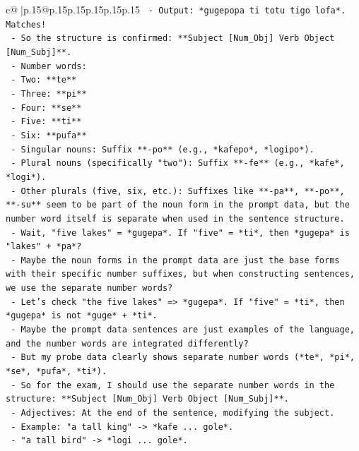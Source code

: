 \documentclass{article}
\begin{document}
{\begin{supertabular}{c@{$\;$}|p{.15\linewidth}@{}p{.15\linewidth}p{.15\linewidth}p{.15\linewidth}p{.15\linewidth}p{.15\linewidth}}
{{{\texttt{          {-} Output: *gugepopa ti totu tigo lofa*. Matches!} \\
\texttt{        {-} So the structure is confirmed: **Subject {[}Num\_Obj{]} Verb Object {[}Num\_Subj{]}**.} \\
\texttt{        {-} Number words:} \\
\texttt{          {-} Two: **te**} \\
\texttt{          {-} Three: **pi**} \\
\texttt{          {-} Four: **se**} \\
\texttt{          {-} Five: **ti**} \\
\texttt{          {-} Six: **pufa**} \\
\texttt{        {-} Singular nouns: Suffix **{-}po** (e.g., *kafepo*, *logipo*).} \\
\texttt{        {-} Plural nouns (specifically "two"): Suffix **{-}fe** (e.g., *kafe*, *logi*).} \\
\texttt{        {-} Other plurals (five, six, etc.): Suffixes like **{-}pa**, **{-}po**, **{-}su** seem to be part of the noun form in the prompt data, but the number word itself is separate when used in the sentence structure.} \\
\texttt{        {-} Wait, "five lakes" = *gugepa*. If "five" = *ti*, then *gugepa* is "lakes" + *pa*?} \\
\texttt{        {-} Maybe the noun forms in the prompt data are just the base forms with their specific number suffixes, but when constructing sentences, we use the separate number words?} \\
\texttt{        {-} Let's check "the five lakes" => *gugepa*. If "five" = *ti*, then *gugepa* is not *guge* + *ti*.} \\
\texttt{        {-} Maybe the prompt data sentences are just examples of the language, and the number words are integrated differently?} \\
\texttt{        {-} But my probe data clearly shows separate number words (*te*, *pi*, *se*, *pufa*, *ti*).} \\
\texttt{        {-} So for the exam, I should use the separate number words in the structure: **Subject {[}Num\_Obj{]} Verb Object {[}Num\_Subj{]}**.} \\
\texttt{        {-} Adjectives: At the end of the sentence, modifying the subject.} \\
\texttt{        {-} Example: "a tall king" {-}> *kafe ... gole*.} \\
\texttt{        {-} "a tall bird" {-}> *logi ... gole*.} \\
}}}
\end{supertabular}}
\end{document}
